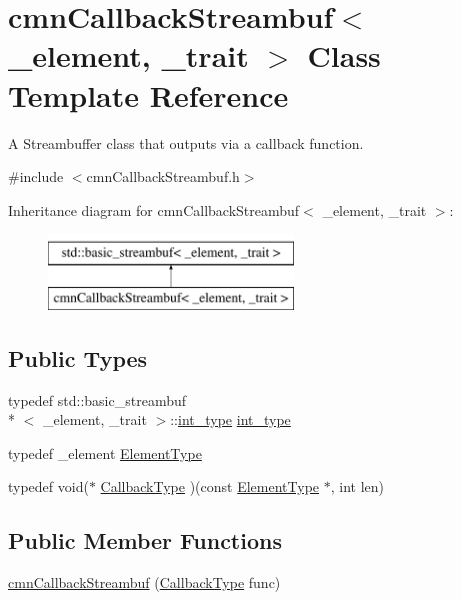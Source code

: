 \hypertarget{classcmn_callback_streambuf}{\section{cmn\-Callback\-Streambuf$<$ \-\_\-element, \-\_\-trait $>$ Class Template Reference}
\label{classcmn_callback_streambuf}
}


A Streambuffer class that outputs via a callback function.  




{\ttfamily \#include $<$cmn\-Callback\-Streambuf.\-h$>$}

Inheritance diagram for cmn\-Callback\-Streambuf$<$ \-\_\-element, \-\_\-trait $>$\-:\begin{figure}[H]
\begin{center}
\leavevmode
\includegraphics[height=2.000000cm]{d6/df3/classcmn_callback_streambuf}
\end{center}
\end{figure}
\subsection*{Public Types}
\begin{DoxyCompactItemize}
\item 
typedef std\-::basic\-\_\-streambuf\\*
$<$ \-\_\-element, \-\_\-trait $>$\-::\hyperlink{classcmn_callback_streambuf_a9599d576e1867902844cb4b5bf3150e8}{int\-\_\-type} \hyperlink{classcmn_callback_streambuf_a9599d576e1867902844cb4b5bf3150e8}{int\-\_\-type}
\item 
typedef \-\_\-element \hyperlink{classcmn_callback_streambuf_a3f220172226bbffc7cebefa8d458823a}{Element\-Type}
\item 
typedef void($\ast$ \hyperlink{classcmn_callback_streambuf_aa8a57c63e583b464a5ef66b3d1dd8117}{Callback\-Type} )(const \hyperlink{classcmn_callback_streambuf_a3f220172226bbffc7cebefa8d458823a}{Element\-Type} $\ast$, int len)
\end{DoxyCompactItemize}
\subsection*{Public Member Functions}
\begin{DoxyCompactItemize}
\item 
\hyperlink{classcmn_callback_streambuf_a09f93d86b52f31efb0387a7041f2ac6b}{cmn\-Callback\-Streambuf} (\hyperlink{classcmn_callback_streambuf_aa8a57c63e583b464a5ef66b3d1dd8117}{Callback\-Type} func)
\end{DoxyCompactItemize}
